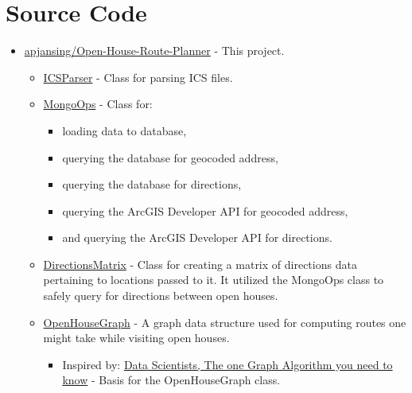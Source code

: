 \section{Source Code}
\begin{itemize}
  \item \href{https://github.com/apjansing/Open-House-Route-Planner}{apjansing/Open-House-Route-Planner} - This project.
  \begin{itemize}
    \item \href{https://github.com/apjansing/Open-House-Route-Planner/blob/master/backend/docker/persistence/pyspark/ICSParser.py}{ICSParser} - Class for parsing ICS files.
      

    \item \href{https://github.com/apjansing/Open-House-Route-Planner/blob/master/backend/docker/persistence/pyspark/MongoOps.py}{MongoOps} - Class for:
      \begin{itemize}
        \item loading data to database, 
        \item querying the database for geocoded address,
        \item querying the database for directions,
        \item querying the ArcGIS Developer API for geocoded address,
        \item and querying the ArcGIS Developer API for directions.
      \end{itemize}
      

    \item \href{https://github.com/apjansing/Open-House-Route-Planner/blob/master/backend/docker/persistence/pyspark/make_directions_matrix.py}{DirectionsMatrix} - Class for creating a matrix of directions data pertaining to locations passed to it. It utilized the MongoOps class to safely query for directions between open houses.
    

    \item \href{https://github.com/apjansing/Open-House-Route-Planner/blob/master/backend/docker/persistence/pyspark/OpenHouseGraph.py}{OpenHouseGraph} - A graph data structure used for computing routes one might take while visiting open houses.
    \begin{itemize}
      \item Inspired by: \href{https://towardsdatascience.com/to-all-data-scientists-the-one-graph-algorithm-you-need-to-know-59178dbb1ec2}{Data Scientists, The one Graph Algorithm you need to know}\cite{Agarwal} - Basis for the OpenHouseGraph class.
    \end{itemize}
    


\end{itemize}
\end{itemize}
